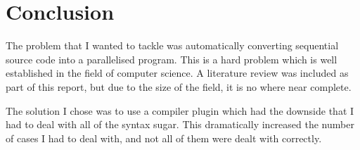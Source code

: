 \chapter{Conclusion}
The problem that I wanted to tackle was automatically converting sequential source code into a parallelised program. This is a hard problem which is well established in the field of computer science. A literature review was included as part of this report, but due to the size of the field, it is no where near complete. 

The solution I chose was to use a compiler plugin which had the downside that I had to deal with all of the syntax sugar. This dramatically increased the number of cases I had to deal with, and not all of them were dealt with correctly.

